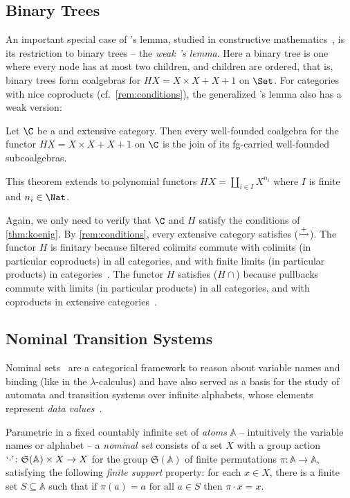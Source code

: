 \documentclass[a4paper,UKenglish, autoref, numberwithinsect, final]{lipics-v2021}
\numberwithin{equation}{section}
\newenvironment{proofhere}[2][Proof of]{%
  \proof{#1~\autoref{#2}}%
}{%
  \endproof%
  \par%
}
\newenvironment{proofappendix}[2][Proof of]{%
    \begin{proofhere}[#1]{#2}
  }{%
    \end{proofhere}
  }
\newcommand{\injmono}{\ensuremath{\overset{\smash{\raisebox{-1pt}{\ensuremath{\scriptstyle+}}}}{\rightarrowtail}}}%
\newcommand{\hpresint}{\ensuremath{H\cap}\xspace}
\theoremstyle{plain}
\theoremstyle{definition}
\newcommand{\Perm}{\mathfrak{S}}
\newcommand{\At}{\mathbb{A}}
\begin{document}
\subsection{Binary Trees}
An important special case of \Konig's lemma, studied in constructive mathematics~\cite{di21}, is its restriction to binary trees -- the \emph{weak \Konig's lemma}. Here a {binary} tree is one where every node has at most two children, and children are ordered, that is, binary trees form coalgebras for $HX = X\times X + X + 1$ on $\Set$. For \lfp categories with nice coproducts (cf.~\autoref{rem:conditions}), the generalized \Konig's lemma also has a weak version:

\begin{theorem}\label{cor:weak-koenigs-lemma}
Let $\C$ be a \lfp and extensive category. Then every well-founded coalgebra for the functor $HX = X\times X + X + 1$ on $\C$ is the join of its fg-carried well-founded subcoalgebras.  
\end{theorem}
This theorem extends to polynomial functors $HX = \coprod_{i\in I} X^{n_i}$ where $I$ is finite and $n_i\in \Nat$.

\begin{proofappendix}{cor:weak-koenigs-lemma}
Again, we only need to verify that $\C$ and $H$ satisfy the conditions of \autoref{thm:koenig}. By \autoref{rem:conditions}, every extensive category satisfies (\injmono). The functor $H$ is finitary because filtered colimits commute with colimits (in particular coproducts) in all categories, and with finite limits (in particular products) in \lfp categories~\cite[Prop.~1.59]{adamek_rosicky_1994}. The functor $H$ satisfies (\hpresint) because pullbacks commute with limits (in particular products) in all categories, and with coproducts in extensive categories~\cite[Lem.~1.4]{ls05}.
\end{proofappendix}




\subsection{Nominal Transition Systems}
\label{sec:nom}
Nominal sets~\cite{pitts13} are a categorical framework to reason about variable names and
binding (like in the $\lambda$-calculus) and have also served as a basis for the 
study of automata and transition systems over infinite alphabets, whose elements represent \emph{data values}~\cite{BojanczykEA14}.

Parametric in a fixed countably infinite set of \emph{atoms} $\At$ -- intuitively the variable
names or alphabet -- a \emph{nominal set} consists of a set $X$ with
a group action $\textnormal{`\ensuremath{\cdot}'}\colon \Perm(\At)\times X\to X$
for the group $\Perm(\At)$ of finite permutations $\pi\colon \At\to \At$, satisfying the following
\emph{finite support} property: for each $x\in X$,
there is a finite set $S\subseteq \At$ such that
%
%
$
  \text{if }\pi(a) = a \text{ for all }a\in S
  \text{ then }\pi\cdot x = x.
$
\end{document}
